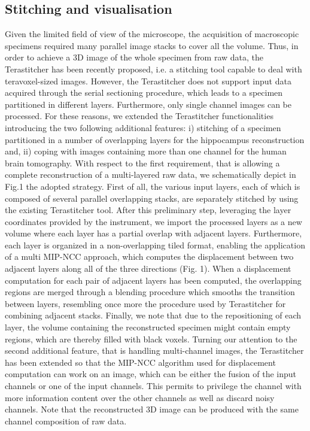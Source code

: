 \documentclass[12pt]{spieman}  %
\begin{document}
\subsection{Stitching and visualisation}
	
Given the limited field of view of the microscope, the acquisition of macroscopic specimens required many parallel image stacks to cover all the volume. Thus, in order to achieve a 3D image of the whole specimen from raw data, the Terastitcher\cite{Bria2012} has been recently proposed, i.e. a stitching tool capable to deal with teravoxel-sized images. However, the Terastitcher does not support input data acquired through the serial sectioning procedure, which leads to a specimen partitioned in different layers. Furthermore, only single channel images can be processed. For these reasons, we extended the Terastitcher functionalities introducing the two following additional features: i) stitching of a specimen partitioned in a number of overlapping layers for the hippocampus reconstruction and, ii) coping with images containing more than one channel for the human brain tomography.
With respect to the first requirement, that is allowing a complete reconstruction of a multi-layered raw data, we schematically depict in Fig.1 the adopted strategy. First of all, the various input layers, each of which is composed of several parallel overlapping stacks, are separately stitched by using the existing Terastitcher tool. After this preliminary step,  leveraging the layer coordinates provided by the instrument, we import the processed layers as a new volume where each layer has a partial overlap with adjacent layers.  Furthermore, each layer is organized in a non-overlapping tiled format, enabling the application of a multi MIP-NCC approach\cite{Bria2012}, which computes the displacement  between two adjacent layers along all of the three directions (Fig. 1). When a displacement computation for each pair of adjacent layers has been computed, the overlapping regions are merged through a blending procedure which smooths the transition between layers, resembling once more the procedure used by Terastitcher for combining adjacent stacks. Finally, we note that due to the repositioning of each layer, the volume containing the reconstructed specimen might contain empty regions, which are thereby filled with black voxels. 
Turning our attention to the second additional feature, that is handling multi-channel images, the Terastitcher has been extended so that the MIP-NCC algorithm used for displacement computation can work on an image, which can be either 
the fusion of the input channels or one of the input channels. This permits to privilege the channel with more information content over the other channels as well as discard noisy channels. Note that the reconstructed 3D image can be produced with the same channel composition of raw data.
\end{document}
